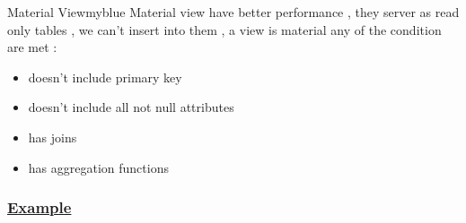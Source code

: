 \begin{prettyBox}{Material View}{myblue}
Material view have better performance , they server as read only tables , we can't insert
into them , a view is material any of the condition are met :
\begin{itemize}
    \item doesn't include primary key
    \item doesn't include all not null attributes
    \item has joins
    \item has aggregation functions
\end{itemize}
\end{prettyBox}

\subsubsection*{\underline{Example}}

